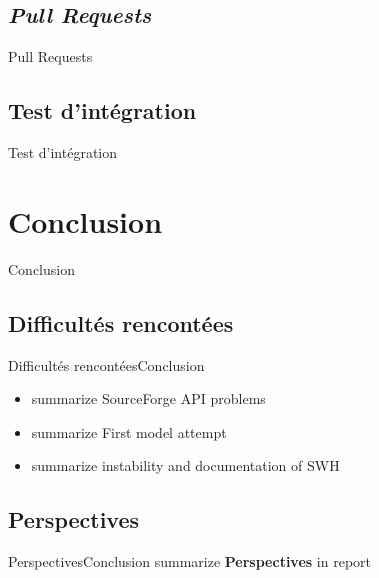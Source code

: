 \documentclass{beamer}
\begin{document}
  \subsection{\textit{Pull Requests}}
    \begin{frame}{Pull Requests}
    \end{frame}

  \subsection{Test d'intégration}
    \begin{frame}{Test d'intégration}
    \end{frame}

\section{Conclusion}
  \begin{frame}{Conclusion}
  \end{frame}

  \subsection{Difficultés rencontées}
    \begin{frame}{Difficultés rencontées}{Conclusion}
      \begin{itemize}
        \item summarize SourceForge API problems
        \item summarize First model attempt
        \item summarize instability and documentation of SWH
      \end{itemize}
    \end{frame}

  \subsection{Perspectives}
    \begin{frame}{Perspectives}{Conclusion}
      summarize \textbf{Perspectives} in report
    \end{frame}
\end{document}
